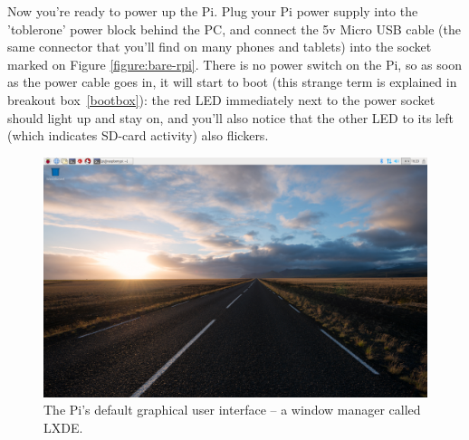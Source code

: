 Now you're ready to power up the Pi. Plug your Pi power supply into the 'toblerone' power block behind the PC, and connect the 5v Micro USB cable (the same connector that you'll find on many phones and tablets) into the socket marked  on Figure \ref{figure:bare-rpi}. There is no power switch on the Pi, so as soon as the power cable goes in, it will start to boot (this strange term is explained in breakout box~\ref{bootbox}): the red LED immediately next to the power socket should light up and stay on, and you'll also notice that the other LED to its left (which indicates SD-card activity) also flickers. 


\begin{figure}
\centerline{\includegraphics[width=14cm]{images/pi3-LXDE-AY17.png}}
\caption{The Pi's default graphical user interface -- a window manager called LXDE.}\label{figure:lxde-gui}
\end{figure}

